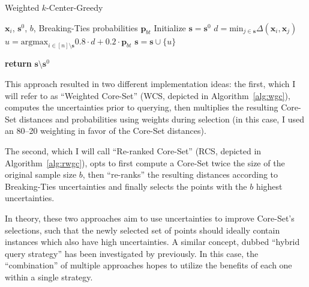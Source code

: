 \documentclass[english,bachelor,ul]{webisthesis} %
\begin{document}
\begin{algorithm}[htpb]
\caption{Weighted $k$-Center-Greedy}%
\label{alg:wgc}
\begin{algorithmic}

\Require $ \mathbf{x}_i $, $ \mathbf{s}^0 $, $ b $, Breaking-Ties probabilities $ \mathbf{p}_{bt} $
\State Initialize $ \mathbf{s} = \mathbf{s}^0 $
\Repeat
\State $ d = \text{min}_{j \in \mathbf{s}} \Delta(\mathbf{x}_i, \mathbf{x}_j) $ 
    \State $ u = \text{argmax}_{i \in [n] \setminus \mathbf{s}} 0.8 \cdot d + 0.2 \cdot \mathbf{p}_{bt} $
\State $ \mathbf{s} = \mathbf{s} \cup \{u\} $

\State \textbf{return} $\mathbf{s} \setminus \mathbf{s}^0 $
\end{algorithmic}
\end{algorithm}

This approach resulted in two different implementation ideas: the first, which I will refer to as ``Weighted Core-Set'' (WCS, depicted in Algorithm~\ref{alg:wgc}), computes the uncertainties prior to querying, then multiplies the resulting Core-Set distances and probabilities using weights during selection (in this case, I used an 80--20 weighting in favor of the Core-Set distances).

The second, which I will call ``Re-ranked Core-Set'' (RCS, depicted in Algorithm~\ref{alg:rwgc}), opts to first compute a Core-Set twice the size of the original sample size $b$, then ``re-ranks'' the resulting distances according to Breaking-Ties uncertainties and finally selects the points with the $b$ highest uncertainties.

In theory, these two approaches aim to use uncertainties to improve Core-Set's selections, such that the newly selected set of points should ideally contain instances which also have high uncertainties. A similar concept, dubbed ``hybrid query strategy'' has been investigated by \cite{DBLP:journals/corr/abs-2110-03785} previously. In this case, the ``combination'' of multiple approaches hopes to utilize the benefits of each one within a single strategy.
\end{document}
